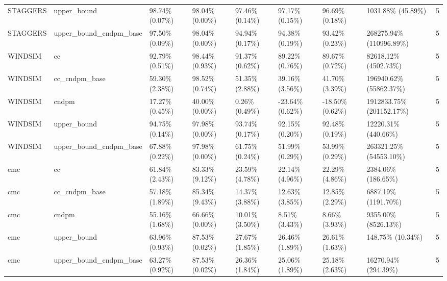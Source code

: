 \begin{tabular}{llllllllr}
        STAGGERS &            upper\_bound &   98.74\% (0.07\%) &  98.04\% (0.00\%) &  97.46\% (0.14\%) &  97.17\% (0.15\%) &  96.69\% (0.18\%) &        1031.88\% (45.89\%) &     5 \\
        STAGGERS & upper\_bound\_cndpm\_base &   97.50\% (0.09\%) &  98.04\% (0.00\%) &  94.94\% (0.17\%) &  94.38\% (0.19\%) &  93.42\% (0.23\%) &  268275.94\% (110996.89\%) &     5 \\
         WINDSIM &                     cc &   92.79\% (0.51\%) &  98.44\% (0.93\%) &  91.37\% (0.62\%) &  89.22\% (0.76\%) &  89.67\% (0.72\%) &     82618.12\% (4502.73\%) &     5 \\
         WINDSIM &          cc\_cndpm\_base &   59.30\% (2.38\%) &  98.52\% (0.74\%) &  51.35\% (2.88\%) &  39.16\% (3.56\%) &  41.70\% (3.39\%) &   196940.62\% (55862.37\%) &     5 \\
         WINDSIM &                  cndpm &   17.27\% (0.45\%) &  40.00\% (0.00\%) &   0.26\% (0.49\%) & -23.64\% (0.62\%) & -18.50\% (0.62\%) & 1912833.75\% (201152.17\%) &     5 \\
         WINDSIM &            upper\_bound &   94.75\% (0.14\%) &  97.98\% (0.00\%) &  93.74\% (0.17\%) &  92.15\% (0.20\%) &  92.48\% (0.19\%) &      12220.31\% (440.66\%) &     5 \\
         WINDSIM & upper\_bound\_cndpm\_base &   67.88\% (0.22\%) &  97.98\% (0.00\%) &  61.75\% (0.24\%) &  51.99\% (0.29\%) &  53.99\% (0.29\%) &   263321.25\% (54553.10\%) &     5 \\
             cmc &                     cc &   61.84\% (2.43\%) &  83.33\% (9.12\%) &  23.59\% (4.78\%) &  22.14\% (4.96\%) &  22.29\% (4.86\%) &       2384.06\% (186.65\%) &     5 \\
             cmc &          cc\_cndpm\_base &   57.18\% (1.89\%) &  85.34\% (9.43\%) &  14.37\% (3.88\%) &  12.63\% (3.85\%) &  12.85\% (2.29\%) &      6887.19\% (1191.70\%) &     5 \\
             cmc &                  cndpm &   55.16\% (1.68\%) &  66.66\% (0.00\%) &  10.01\% (3.50\%) &   8.51\% (3.43\%) &   8.66\% (3.93\%) &      9355.00\% (8526.13\%) &     5 \\
             cmc &            upper\_bound &   63.96\% (0.93\%) &  87.53\% (0.02\%) &  27.67\% (1.85\%) &  26.46\% (1.89\%) &  26.61\% (1.63\%) &         148.75\% (10.34\%) &     5 \\
             cmc & upper\_bound\_cndpm\_base &   63.27\% (0.92\%) &  87.53\% (0.02\%) &  26.36\% (1.84\%) &  25.06\% (1.89\%) &  25.18\% (2.63\%) &      16270.94\% (294.39\%) &     5 \\
\bottomrule
\end{tabular}
